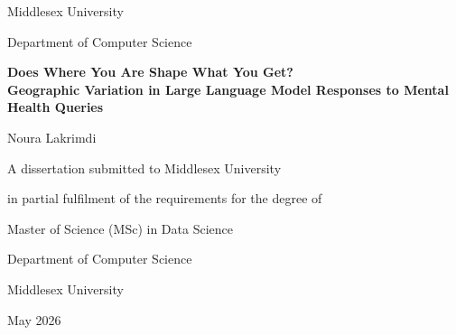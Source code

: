 \documentclass[12pt,a4paper,oneside]{report}
\begin{document}

\begin{titlepage}
\centering

%
\vspace{3.2cm}

{\Large Middlesex University\par}
{\large Department of Computer Science\par}

\vspace{2cm}

{\LARGE\bfseries
Does Where You Are Shape What You Get?\\[0.4cm]
Geographic Variation in Large Language Model Responses to Mental Health Queries
}
\par

\vspace{2cm}

{\Large Noura Lakrimdi\par}

\vspace{2cm}

A dissertation submitted to Middlesex University

in partial fulfilment of the requirements for the degree of

\vspace{0.8cm}

{\Large Master of Science (MSc) in Data Science}

\vspace{1.5cm}

Department of Computer Science

Middlesex University

\vfill

May 2026

\end{titlepage}

\end{document}
